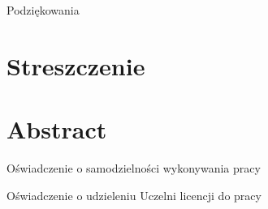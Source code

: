 Podziękowania

\newpage

\section*{Streszczenie}

\newpage

\section*{Abstract}

\newpage

Oświadczenie o samodzielności wykonywania pracy

\newpage

Oświadczenie o udzieleniu Uczelni licencji do pracy

\newpage